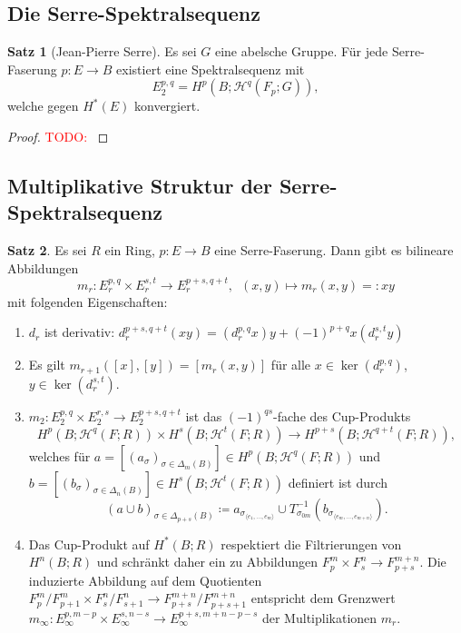 \documentclass[11pt, a4paper, german]{article}
\theoremstyle{definition}
\newtheorem{satz}{Satz}
\theoremstyle{remark}
\newcommand{\TODO}[1]{\textcolor{red}{TODO: #1}} %
\newcommand{\angles}[1]{{\langle #1 \rangle}}
\newcommand{\LH}{\mathcal{H}} %
\begin{document}
\subsection{Die Serre-Spektralsequenz}

\begin{satz}[Jean-Pierre Serre]
  Es sei $G$ eine abelsche Gruppe.
  Für jede Serre-Faserung $p : E \to B$ existiert eine Spektralsequenz mit
  \[ E_2^{p,q} = H^p(B; \LH^q(F_p; G)), \]
  welche gegen $H^*(E)$ konvergiert.
\end{satz}

\begin{proof}
  \TODO{}
\end{proof}

\subsection{Multiplikative Struktur der Serre-Spektralsequenz}

\begin{satz}
  Es sei $R$ ein Ring, $p : E \to B$ eine Serre-Faserung.
  Dann gibt es bilineare Abbildungen
  \[ m_r : E^{p,q}_r \times E^{s,t}_r \to E^{p+s,q+t}_r, \enspace (x, y) \mapsto m_r(x, y) =: xy \]
  mit folgenden Eigenschaften:
  \begin{enumerate}[label=(\roman*)]
    \item $d_r$ ist derivativ: $d_r^{p+s,q+t}(xy) = (d_r^{p,q} x) y + (-1)^{p+q} x (d_r^{s,t} y)$
    \item Es gilt $m_{r+1}([x], [y]) = [m_r(x, y)]$ für alle $x \in \ker(d_r^{p,q})$, $y \in \ker(d_r^{s,t})$.
    \item $m_2 : E_2^{p,q} \!\times\! E_2^{r,s} \!\to\! E_2^{p+s,q+t}$ ist das $(-1)^{qs}$-fache des Cup-Produkts
    \[
      H^p(B; \LH^q(F; R)) \times H^s(B; \LH^t(F; R)) \to H^{p+s}(B; \LH^{q+t}(F; R)),
    \]
    welches für $a = [(a_\sigma)_{\sigma \in \Delta_m(B)}] \in H^p(B; \LH^q(F; R))$ und $b = [(b_\sigma)_{\sigma \in \Delta_n(B)}] \in H^s(B; \LH^t(F; R))$ definiert ist durch
    \[
      (a \cup b)_{\sigma \in \Delta_{p+s}(B)} \coloneqq
      a_{\sigma_{\angles{e_1, \ldots, e_m}}} \cup T_{\sigma_{0m}}^{-1}(b_{\sigma_{\angles{e_m, \ldots, e_{m+n}}}}).
    \]
    \item Das Cup-Produkt auf $H^*(B; R)$ respektiert die Filtrierungen von $H^n(B; R)$ und schränkt daher ein zu Abbildungen $F_p^m \times F_s^n \to F_{p+s}^{m+n}$.
    Die induzierte Abbildung auf dem Quotienten $F^m_p/F^m_{p+1} \times F^n_s/F^n_{s+1} \to F^{m+n}_{p+s} / F^{m+n}_{p+s+1}$ entspricht dem Grenzwert $m_\infty : E_\infty^{p,m-p} \times E_\infty^{s,n-s} \to E_\infty^{p+s,m+n-p-s}$ der Multiplikationen $m_r$.
  \end{enumerate}
\end{satz}
\end{document}
